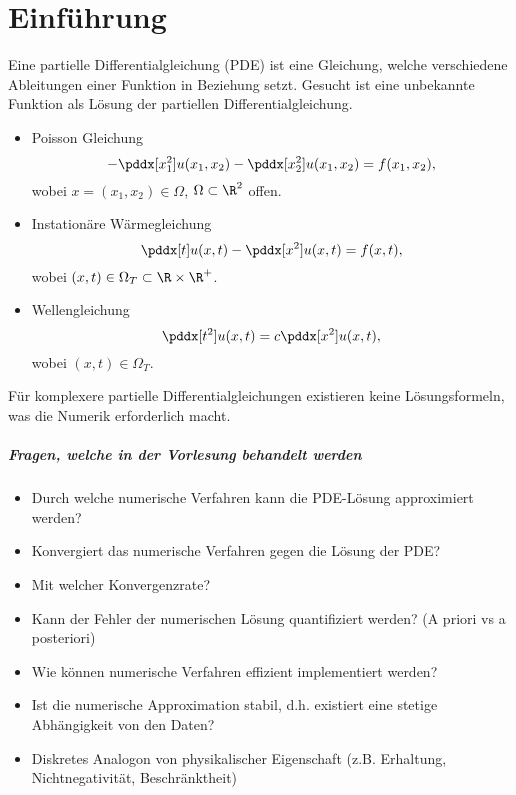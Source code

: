 \chapter{Einführung}


Eine partielle Differentialgleichung (PDE) ist eine Gleichung, welche verschiedene Ableitungen einer Funktion in Beziehung setzt.
Gesucht ist eine unbekannte Funktion als Lösung der partiellen Differentialgleichung.

\begin{ex*}
	\begin{itemize}
		\item
			Poisson Gleichung
			\[
				- \pddx[x_1^2] u(x_1,x_2) - \pddx[x_2^2] u(x_1, x_2) = f(x_1, x_2),
			\]
			wobei $x = (x_1, x_2) \in \Omega$, $\Omega \subset \R^2$ offen.
		\item
			Instationäre Wärmegleichung
			\[
				\pddx[t] u(x,t) - \pddx[x^2] u(x,t) = f(x, t),
			\]
			wobei $(x, t) \in \Omega_T \subset \R \times \R^+$.
		\item
			Wellengleichung
			\[
				\pddx[t^2] u(x, t) = c \pddx[x^2] u(x,t),
			\]
			wobei $(x,t) \in \Omega_T$.
	\end{itemize}
\end{ex*}

Für komplexere partielle Differentialgleichungen existieren keine Lösungsformeln, was die Numerik erforderlich macht.

\paragraph{Fragen, welche in der Vorlesung behandelt werden}

\begin{itemize}
	\item
		Durch welche numerische Verfahren kann die PDE-Lösung approximiert werden?
	\item
		Konvergiert das numerische Verfahren gegen die Lösung der PDE?
	\item
		Mit welcher Konvergenzrate?
	\item
		Kann der Fehler der numerischen Lösung quantifiziert werden? (A priori vs a posteriori)
	\item
		Wie können numerische Verfahren effizient implementiert werden?
	\item
		Ist die numerische Approximation stabil, d.h. existiert eine stetige Abhängigkeit von den Daten?
	\item
		Diskretes Analogon von physikalischer Eigenschaft (z.B. Erhaltung, Nichtnegativität, Beschränktheit)
\end{itemize}

